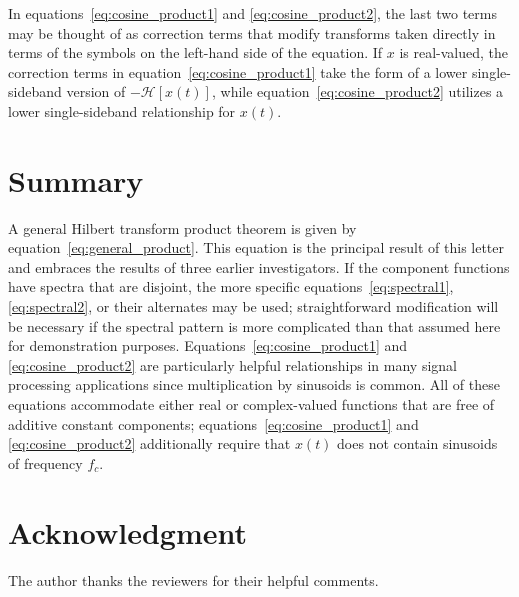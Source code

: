 \documentclass[12pt]{article}
\begin{document}
In equations~\eqref{eq:cosine_product1} and \eqref{eq:cosine_product2}, the last two terms may be thought of as correction terms that modify transforms taken directly in terms of the symbols on the left-hand side of the equation. If $x$ is real-valued, the correction terms in equation~\eqref{eq:cosine_product1} take the form of a lower single-sideband version of $-\mathcal{H}[x(t)]$, while equation~\eqref{eq:cosine_product2} utilizes a lower single-sideband relationship for $x(t)$.

\section{Summary}

A general Hilbert transform product theorem is given by equation~\eqref{eq:general_product}. This equation is the principal result of this letter and embraces the results of three earlier investigators. If the component functions have spectra that are disjoint, the more specific equations~\eqref{eq:spectral1}, \eqref{eq:spectral2}, or their alternates may be used; straightforward modification will be necessary if the spectral pattern is more complicated than that assumed here for demonstration purposes. Equations~\eqref{eq:cosine_product1} and \eqref{eq:cosine_product2} are particularly helpful relationships in many signal processing applications since multiplication by sinusoids is common. All of these equations accommodate either real or complex-valued functions that are free of additive constant components; equations~\eqref{eq:cosine_product1} and \eqref{eq:cosine_product2} additionally require that $x(t)$ does not contain sinusoids of frequency $f_c$.

\section*{Acknowledgment}
The author thanks the reviewers for their helpful comments.
\end{document}
